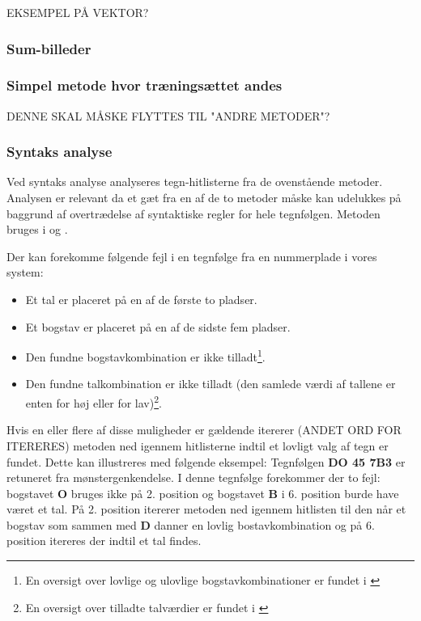 EKSEMPEL PÅ VEKTOR?

\subsubsection{Sum-billeder}

\subsubsection{Simpel metode hvor træningsættet andes}

DENNE SKAL MÅSKE FLYTTES TIL "ANDRE METODER"?

\subsubsection{Syntaks analyse}

Ved syntaks analyse analyseres tegn-hitlisterne fra de ovenstående metoder. Analysen er relevant da et gæt fra en af de to metoder måske kan udelukkes på baggrund af overtrædelse af syntaktiske regler for hele tegnfølgen. Metoden bruges i \cite{nijhuis} og \cite{kwas}.

Der kan forekomme følgende fejl i en tegnfølge fra en nummerplade i vores system:

\begin{itemize}
\item Et tal er placeret på en af de første to pladser.
\item Et bogstav er placeret på en af de sidste fem pladser.
\item Den fundne bogstavkombination er ikke tilladt\footnote{En oversigt over lovlige og ulovlige bogstavkombinationer er fundet i \cite{bogstav_komb}}.
\item Den fundne talkombination er ikke tilladt (den samlede værdi af tallene er enten for høj eller for lav)\footnote{En oversigt over tilladte talværdier er fundet i \cite{nrpl}}.
\end{itemize}

Hvis en eller flere af disse muligheder er gældende itererer (ANDET ORD FOR ITERERES) metoden ned igennem hitlisterne indtil et lovligt valg af tegn er fundet. Dette kan illustreres med følgende eksempel: Tegnfølgen \textbf{DO 45 7B3} er retuneret fra mønstergenkendelse. I denne tegnfølge forekommer der to fejl: bogstavet \textbf{O} bruges ikke på 2. position og bogstavet \textbf{B} i 6. position burde have været et tal. På 2. position itererer metoden ned igennem hitlisten til den når et bogstav som sammen med \textbf{D} danner en lovlig bostavkombination og på 6. position itereres der indtil et tal findes.

